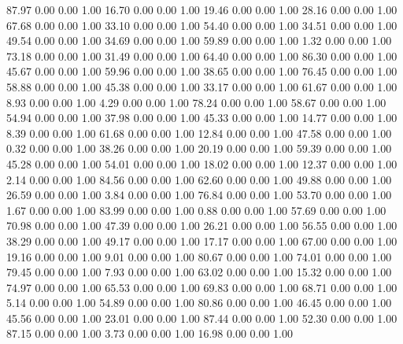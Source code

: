    87.97   0.00   0.00   1.00
   16.70   0.00   0.00   1.00
   19.46   0.00   0.00   1.00
   28.16   0.00   0.00   1.00
   67.68   0.00   0.00   1.00
   33.10   0.00   0.00   1.00
   54.40   0.00   0.00   1.00
   34.51   0.00   0.00   1.00
   49.54   0.00   0.00   1.00
   34.69   0.00   0.00   1.00
   59.89   0.00   0.00   1.00
    1.32   0.00   0.00   1.00
   73.18   0.00   0.00   1.00
   31.49   0.00   0.00   1.00
   64.40   0.00   0.00   1.00
   86.30   0.00   0.00   1.00
   45.67   0.00   0.00   1.00
   59.96   0.00   0.00   1.00
   38.65   0.00   0.00   1.00
   76.45   0.00   0.00   1.00
   58.88   0.00   0.00   1.00
   45.38   0.00   0.00   1.00
   33.17   0.00   0.00   1.00
   61.67   0.00   0.00   1.00
    8.93   0.00   0.00   1.00
    4.29   0.00   0.00   1.00
   78.24   0.00   0.00   1.00
   58.67   0.00   0.00   1.00
   54.94   0.00   0.00   1.00
   37.98   0.00   0.00   1.00
   45.33   0.00   0.00   1.00
   14.77   0.00   0.00   1.00
    8.39   0.00   0.00   1.00
   61.68   0.00   0.00   1.00
   12.84   0.00   0.00   1.00
   47.58   0.00   0.00   1.00
    0.32   0.00   0.00   1.00
   38.26   0.00   0.00   1.00
   20.19   0.00   0.00   1.00
   59.39   0.00   0.00   1.00
   45.28   0.00   0.00   1.00
   54.01   0.00   0.00   1.00
   18.02   0.00   0.00   1.00
   12.37   0.00   0.00   1.00
    2.14   0.00   0.00   1.00
   84.56   0.00   0.00   1.00
   62.60   0.00   0.00   1.00
   49.88   0.00   0.00   1.00
   26.59   0.00   0.00   1.00
    3.84   0.00   0.00   1.00
   76.84   0.00   0.00   1.00
   53.70   0.00   0.00   1.00
    1.67   0.00   0.00   1.00
   83.99   0.00   0.00   1.00
    0.88   0.00   0.00   1.00
   57.69   0.00   0.00   1.00
   70.98   0.00   0.00   1.00
   47.39   0.00   0.00   1.00
   26.21   0.00   0.00   1.00
   56.55   0.00   0.00   1.00
   38.29   0.00   0.00   1.00
   49.17   0.00   0.00   1.00
   17.17   0.00   0.00   1.00
   67.00   0.00   0.00   1.00
   19.16   0.00   0.00   1.00
    9.01   0.00   0.00   1.00
   80.67   0.00   0.00   1.00
   74.01   0.00   0.00   1.00
   79.45   0.00   0.00   1.00
    7.93   0.00   0.00   1.00
   63.02   0.00   0.00   1.00
   15.32   0.00   0.00   1.00
   74.97   0.00   0.00   1.00
   65.53   0.00   0.00   1.00
   69.83   0.00   0.00   1.00
   68.71   0.00   0.00   1.00
    5.14   0.00   0.00   1.00
   54.89   0.00   0.00   1.00
   80.86   0.00   0.00   1.00
   46.45   0.00   0.00   1.00
   45.56   0.00   0.00   1.00
   23.01   0.00   0.00   1.00
   87.44   0.00   0.00   1.00
   52.30   0.00   0.00   1.00
   87.15   0.00   0.00   1.00
    3.73   0.00   0.00   1.00
   16.98   0.00   0.00   1.00
